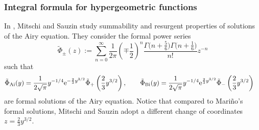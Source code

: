 \documentclass[10pt,a4paper]{amsart}
\newcommand{\series}[1]{\tilde{#1}}
\numberwithin{equation}{section}
\begin{document}
\subsubsection{Integral formula for hypergeometric functions}
%
In \cite{diverg-resurg-i}, Mitschi and Sauzin study summability and resurgent properties of solutions of the Airy equation. They consider the formal power series
\[\series{\Phi}_{\pm}(z):= \sum_{n=0}^{\infty}\frac{1}{2\pi}\left(\mp\frac{1}{2}\right)^{n}\frac{\Gamma\bigl(n+\frac{5}{6}\bigr)\Gamma\bigl(n+\frac{1}{6}\bigr)}{n!}z^{-n}\]
such that
\begin{align*}
\series{\Phi}_{\mathrm{Ai}}(y)&=\frac{1}{2\sqrt{\pi}}y^{-1/4}{\rm e}^{-\frac{2}{3}y^{3/2}}\series{\Phi}_{+}\left(\frac{2}{3}y^{3/2}\right),\qquad
\series{\Phi}_{\mathrm{Bi}}(y)=\frac{1}{2\sqrt{\pi}}y^{-1/4}{\rm e}^{\frac{2}{3}y^{3/2}}\series{\Phi}_{-}\left(\frac{2}{3}y^{3/2}\right)
\end{align*}
are formal solutions of the Airy equation. Notice that compared to Mari\~{n}o's formal solutions, Mitschi and Sauzin adopt a different change of coordinates $z=\frac{2}{3}y^{3/2}$.
\end{document}
